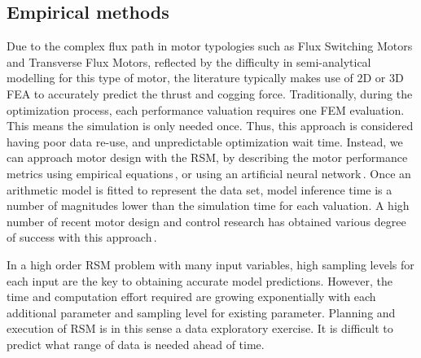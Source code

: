     
    \subsection{Empirical methods}                  \label{Chapter:background/modelling techniques for designing motors/empirical methods}


        Due to the complex flux path in motor typologies such as Flux Switching Motors and Transverse Flux Motors, reflected by the difficulty in semi-analytical modelling for this type of motor, the literature typically makes use of $\mathrm{2D}$ or $\mathrm{3D}$ \acs{FEA} to accurately predict the thrust and cogging force. Traditionally, during the optimization process, each performance valuation requires one FEM evaluation. This means the simulation is only needed once. Thus, this approach is considered having poor data re-use, and unpredictable optimization wait time. Instead, we can approach motor design with the \acf{RSM}, by describing the motor performance metrics using empirical equations\,\cite{Hong2008,Lei2013}, or using an artificial neural network\,\cite{Hadjout2006,Ashabani2010}. Once an arithmetic model is fitted to represent the data set, model inference time is a number of magnitudes lower than the simulation time for each valuation. A high number of recent motor design and control research has obtained various degree of success with this approach\,\cite{Hwang2007,Lee2012,Kim2006,Jung2015,Hong2018}. 
        
        
        In a high order \acs{RSM} problem with many input variables, high sampling levels for each input are the key to obtaining accurate model predictions. However, the time and computation effort required are growing exponentially with each additional parameter and sampling level for existing parameter. Planning and execution of \acs{RSM} is in this sense a data exploratory exercise. It is difficult to predict what range of data is needed ahead of time.


